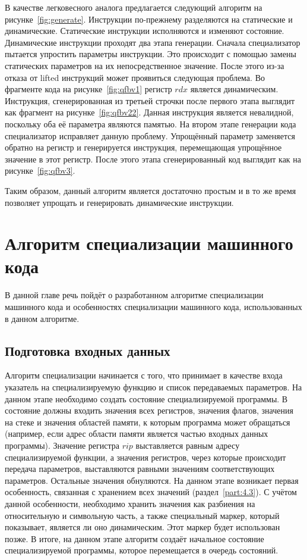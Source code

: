 В качестве легковесного аналога предлагается следующий алгоритм на рисунке~\ref{fig:generate}. Инструкции по-прежнему разделяются на статические и динамические. Статические инструкции исполняются и изменяют состояние. Динамические инструкции проходят два этапа генерации. Сначала специализатор пытается упростить параметры инструкции. Это происходит с помощью замены статических параметров на их непосредственное значение. После этого из-за отказа от lifted инструкций может проявиться следующая проблема.
Во фрагменте кода на рисунке~\ref{fig:qfbv1} регистр $rdx$ является динамическим. Инструкция, сгенерированная из третьей строчки после первого этапа выглядит как фрагмент на рисунке~\ref{fig:qfbv22}.
Данная инструкция является невалидной, поскольку оба её параметра являются памятью. На втором этапе генерации кода специализатор исправляет данную проблему. Упрощённый параметр заменяется обратно на регистр и генерируется инструкция, перемещающая упрощённое значение в этот регистр. После этого этапа сгенерированный код выглядит как на рисунке~\ref{fig:qfbv3}.

Таким образом, данный алгоритм является достаточно простым и в то же время позволяет упрощать и генерировать динамические инструкции.

\section{ Алгоритм специализации машинного кода}
В данной главе речь пойдёт о разработанном алгоритме специализации машинного кода и особенностях специализации машинного кода, использованных в данном алгоритме.

\subsection{ Подготовка входных данных}
Алгоритм специализации начинается с того, что принимает в качестве входа указатель на специализируемую функцию и список передаваемых параметров. На данном этапе необходимо создать состояние специализируемой программы. В состояние должны входить значения всех регистров, значения флагов, значения на стеке и значения областей памяти, к которым программа может обращаться (например, если адрес области памяти является частью входных данных программы).
Значение регистра $rip$ выставляется равным адресу специализируемой функции, а значения регистров,
через которые происходит передача параметров, выставляются равными значениям соответствующих параметров.
Остальные значения обнуляются. На данном этапе возникает первая особенность, связанная с хранением всех значений (раздел~\ref{part:4.3}).
С учётом данной особенности, необходимо хранить значения как разбиения на относительную и символьную часть, а также специальный маркер, который показывает, является ли оно динамическим. Этот маркер будет использован позже. В итоге, на данном этапе алгоритм создаёт начальное состояние специализируемой программы, которое перемещается в очередь состояний.

